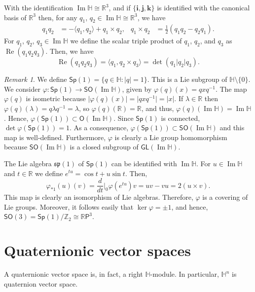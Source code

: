 \documentclass[12pt, a4paper]{amsart}
\newcommand{\g}{\mathfrak}
\newcommand{\R}{\mathbb{R}}
\renewcommand{\H}{\mathbb{H}}
\renewcommand{\Re}{\operatorname{Re}}
\renewcommand{\Im}{\operatorname{Im}}
\newcommand{\Sp}{\mathsf{Sp}}
\theoremstyle{remark}
\newtheorem*{remark}{Remark}
\begin{document}
With the identification $\Im\H\cong\R^3$, and if $\{\mathbf{i},\mathbf{j},\mathbf{k}\}$ is identified with the canonical basis of $\R^3$ then, for any $q_1$, $q_2\in\Im{\H}\cong\R^3$, we have 
\[
\begin{aligned}
q_1 q_2
&{}=-\langle q_1,q_2\rangle+q_1\times q_2,
&q_1\times q_2
&{}=\frac{1}{2}(q_1q_2-q_2q_1).
\end{aligned}
\]
For $q_1$, $q_2$, $q_3\in\Im\H$ we define the scalar triple product of $q_1$, $q_2$, and $q_3$ as $\Re(q_1q_2q_3)$.
Then, we have
\[
\Re(q_1q_2q_3)=\langle q_1,q_2\times q_3\rangle=\det(q_1\vert q_2\vert q_3).
\]

\begin{remark}
We define $\Sp(1)=\{q\in\H:\lvert q\rvert =1\}$.
This is a Lie subgroup of $\H\setminus\{0\}$.
We consider $\varphi\colon\Sp(1)\to\mathsf{SO}(\Im\H)$, given by $\varphi(q)(x)=qxq^{-1}$. 
The map $\varphi(q)$ is isometric because $\lvert\varphi(q)(x)\rvert=\lvert qxq^{-1}\rvert=\lvert x\rvert$. 
If $\lambda\in\R$ then $\varphi(q)(\lambda)=q\lambda q^{-1}=\lambda$, so $\varphi(q)(\R)=\R$, and thus, $\varphi(q)(\Im\H)=\Im\H$. 
Hence, $\varphi(\Sp(1))\subset\mathsf{O}(\Im\H)$.
Since $\Sp(1)$ is connected, $\det\varphi(\Sp(1))=1$. 
As a consequence, $\varphi(\Sp(1))\subset\mathsf{SO}(\Im\H)$ and this map is well-defined.
Furthermore, $\varphi$ is clearly a Lie group homomorphism because $\mathsf{SO}(\Im\H)$ is a closed subgroup of $\mathsf{GL}(\Im\H)$. 

The Lie algebra $\g{sp}(1)$ of $\Sp(1)$ can be identified with $\Im\H$.
For $u\in\Im\H$ and $t\in\R$ we define $e^{tu}=\cos t+u\sin t$.
Then, 
\[
\varphi_{*1}(u)(v)=\frac{d}{dt}\bigg\vert_0\varphi(e^{tu})v=uv-vu=2(u\times v).
\]
This map is clearly an isomorphism of Lie algebras. 
Therefore, $\varphi$ is a covering of Lie groups.
Moreover, it follows easily that $\ker\varphi={\pm 1}$, and hence, $\mathsf{SO}(3)=\Sp(1)/\mathbb{Z}_2\cong\R\mathsf{P}^3$.
\end{remark}

\section{Quaternionic vector spaces}\label{sec:vector-spaces}

A quaternionic vector space is, in fact, a right $\H$-module.
In particular, $\H^n$ is quaternion vector space.
\end{document}
